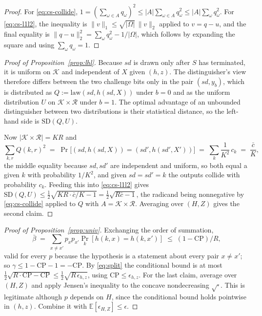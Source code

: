 \documentclass{aicr-solution}
\newcommand{\sd}{\mathit{sd}}
\newcommand{\SD}{\mathrm{SD}}
\newcommand{\calK}{\mathcal{K}}
\newcommand{\calR}{\mathcal{R}}
\newcommand{\CP}{\mathrm{CP}}
\begin{document}
\begin{proof}
For \eqref{eq:cs-collide}, $1 = (\sum_{\omega \in A} q_\omega)^2 \le |A| \sum_{\omega \in A}
q_\omega^2 \le |A| \sum_\omega q_\omega^2$. For \eqref{eq:cs-l1l2}, the inequality is
$\|v\|_1 \le \sqrt{|\Omega|}\,\|v\|_2$ applied to $v = q - u$, and the final equality is
$\|q-u\|_2^2 = \sum_\omega q_\omega^2 - 1/|\Omega|$, which follows by expanding the square and
using $\sum_\omega q_\omega = 1$.
\end{proof}
\begin{proof}[Proof of Proposition~\ref{prop:lhl}]
Because $\sd$ is drawn only after $S$ has terminated, it is uniform on $\calK$ and independent of
$X$ given $(h,z)$. The distinguisher's view therefore differs between the two challenge bits only
in the pair $(\sd, y_b)$, which is distributed as $Q := \mathrm{law}(\sd, h(\sd,X))$ under $b = 0$
and as the uniform distribution $U$ on $\calK \times \calR$ under $b = 1$. The optimal advantage of
an unbounded distinguisher between two distributions is their statistical distance, so the
left-hand side is $\SD(Q,U)$.

Now $|\calK \times \calR| = KR$ and
\[
  \sum_{k,r} Q(k,r)^2
  \;=\; \Pr\bigl[(\sd, h(\sd,X)) = (\sd', h(\sd',X'))\bigr]
  \;=\; \sum_{k} \frac{1}{K^2}\,c_k
  \;=\; \frac{\bar c}{K} ,
\]
the middle equality because $\sd,\sd'$ are independent and uniform, so both equal a given $k$ with
probability $1/K^2$, and given $\sd = \sd' = k$ the outputs collide with probability $c_k$. Feeding
this into \eqref{eq:cs-l1l2} gives
$\SD(Q,U) \le \tfrac12\sqrt{KR \cdot \bar c/K - 1} = \tfrac12\sqrt{R\bar c - 1}$, the radicand being
nonnegative by \eqref{eq:cs-collide} applied to $Q$ with $A = \calK\times\calR$. Averaging over
$(H,Z)$ gives the second claim.
\end{proof}
\begin{proof}[Proof of Proposition~\ref{prop:univ}]
Exchanging the order of summation,
\[
  \bar\beta \;=\; \sum_{x \neq x'} p_x p_{x'} \Pr_k[h(k,x) = h(k,x')] \;\le\; (1 - \CP)/R ,
\]
valid for every $p$ because the hypothesis is a statement about every pair $x \neq x'$; so
$\gamma \le 1 - \CP - 1 = -\CP$. By \eqref{eq:split} the conditional bound is at most
$\tfrac12\sqrt{R\cdot\CP - \CP} \le \tfrac12\sqrt{R\,\epsilon_{h,z}}$, using $\CP \le
\epsilon_{h,z}$. For the last claim, average over $(H,Z)$ and apply Jensen's inequality to the
concave nondecreasing $\sqrt{\cdot}$. This is legitimate although $p$ depends on $H$, since the
conditional bound holds pointwise in $(h,z)$. Combine it with
$\mathbb{E}[\epsilon_{H,Z}] \le \epsilon$.
\end{proof}
\end{document}

